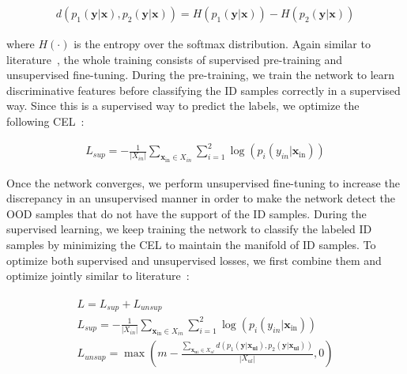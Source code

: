 \vspace{-6mm}
\begin{align}
    d\left(p_{1}(\mathbf{y} | \mathbf{x}), p_{2}(\mathbf{y} | \mathbf{x})\right)=H\left(p_{1}(\mathbf{y} | \mathbf{x})\right)-H\left(p_{2}(\mathbf{y} | \mathbf{x})\right)
    \label{eq:dis_loss_1}
\end{align}

\noindent where $H(\cdot)$ is the entropy over the softmax distribution. Again similar to literature~\cite{yu2019unsupervised}, the whole training consists of supervised pre-training and unsupervised fine-tuning. During the pre-training, we train the network to learn discriminative features before classifying the ID samples correctly in a supervised way. Since this is a supervised way to predict the labels, we optimize the following CEL~\cite{yu2019unsupervised}:

\vspace{-6mm}
\begin{align}
    {L}_{sup}=-\frac{1}{\left|X_{i n}\right|} \sum_{\mathbf{x}_{\mathrm{in}} \in X_{i n}} \sum_{i=1}^{2} \log \left(p_{i}\left(y_{i n} | \mathbf{x}_{\mathrm{in}}\right)\right)
\end{align}

\hspace*{3.5mm} Once the network converges, we perform unsupervised fine-tuning to increase the discrepancy in an unsupervised manner in order to make the network detect the OOD samples that do not have the support of the ID samples. During the supervised learning, we keep training the network to classify the labeled ID samples by minimizing the CEL to maintain the manifold of ID samples. To optimize both supervised and unsupervised losses, we first combine them and optimize jointly similar to literature~\cite{yu2019unsupervised}: 

\vspace{-4mm}
\begin{align}
    \begin{array}{c}
        {L}={L}_{sup}+{L}_{unsup} \\ 
        {L}_{sup}=-\frac{1}{\left|X_{i n}\right|} \sum_{\mathbf{x}_{\mathrm{in}} \in X_{in}} \sum_{i=1}^{2} \log \left(p_{i}\left(y_{i n} | \mathbf{x}_{\mathrm{in}}\right)\right) \\ 
        {L}_{unsup}=\max \left(m-\frac{\sum_{\mathbf{x}_{\mathbf{u} 1} \in X_{ul}} d\left(p_{1}\left(\mathbf{y} | \mathbf{x}_{\mathbf{ul}}\right), p_{2}\left(\mathbf{y} | \mathbf{x}_{\mathbf{ul}}\right)\right)} {\left|X_{ul}\right|},0\right)
    \end{array}
    \label{eq:ood_join_loss}
\end{align}

